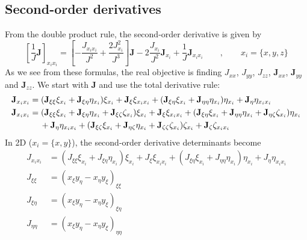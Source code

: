 \documentclass{article}
\begin{document}
\subsection{Second-order derivatives}\noindent
From the double product rule, the second-order derivative is given by
\begin{equation}
\left[\frac{1}{J}\mathbf{J}\right]_{x_i x_i} = \left[-\frac{J_{x_i x_i}}{J^2}+\frac{2J_{x_i}^2}{J^3}\right]\mathbf{J}-2\frac{J_{x_i}}{J^2}\mathbf{J}_{x_i}+\frac{1}{J}\mathbf{J}_{x_i x_i} \qquad,\qquad x_i = \{x,y,z\}
\end{equation}
As we see from these formulas, the real objective is finding $J_{xx}$, $J_{yy}$, $J_{zz}$, $\mathbf{J}_{xx}$, $\mathbf{J}_{yy}$ and $\mathbf{J}_{zz}$. We start with $\mathbf{J}$ and use the total derivative rule:
\begin{subequations}
\begin{align}
&\mathbf{J}_{x_i x_i} = (\mathbf{J}_{\xi\xi}\xi_{x_i}+\mathbf{J}_{\xi\eta}\eta_{x_i})\xi_{x_i}+\mathbf{J}_{\xi}\xi_{x_i x_i}+(\mathbf{J}_{\xi\eta}\xi_{x_i}+\mathbf{J}_{\eta\eta}\eta_{x_i})\eta_{x_i}+\mathbf{J}_{\eta}\eta_{x_i x_i} \\
&\mathbf{J}_{x_i x_i} = (\mathbf{J}_{\xi\xi}\xi_{x_i}+\mathbf{J}_{\xi\eta}\eta_{x_i}+\mathbf{J}_{\xi\zeta}\zeta_{x_i})\xi_{x_i}+\mathbf{J}_{\xi}\xi_{x_i x_i}+(\mathbf{J}_{\xi\eta}\xi_{x_i}+\mathbf{J}_{\eta\eta}\eta_{x_i}+\mathbf{J}_{\eta\zeta}\zeta_{x_i})\eta_{x_i} \notag \\
&\hspace{12mm}+\mathbf{J}_{\eta}\eta_{x_i x_i}+(\mathbf{J}_{\xi\zeta}\xi_{x_i}+\mathbf{J}_{\eta\zeta}\eta_{x_i}+\mathbf{J}_{\zeta\zeta}\zeta_{x_i})\zeta_{x_i}+\mathbf{J}_{\zeta}\zeta_{x_i x_i}
\end{align}
\end{subequations}
In 2D ($x_i = \{x,y\}$), the second-order derivative determinants become
\begin{subequations}
\begin{align}
J_{x_i x_i}	&= \left(J_{\xi\xi}\xi_{x_i}+J_{\xi\eta}\eta_{x_i}\right)\xi_{x_i}+J_{\xi}\xi_{x_i x_i}+\left(J_{\xi\eta}\xi_{x_i}+J_{\eta\eta}\eta_{x_i}\right)\eta_{x_i}+J_{\eta}\eta_{x_i x_i} \\
J_{\xi\xi} 	&= (x_{\xi}y_{\eta}-x_{\eta}y_{\xi})_{\xi\xi} \\
J_{\xi\eta} 	&= (x_{\xi}y_{\eta}-x_{\eta}y_{\xi})_{\xi\eta} \\
J_{\eta\eta} 	&= (x_{\xi}y_{\eta}-x_{\eta}y_{\xi})_{\eta\eta}
\end{align}
\end{subequations}
\end{document}
